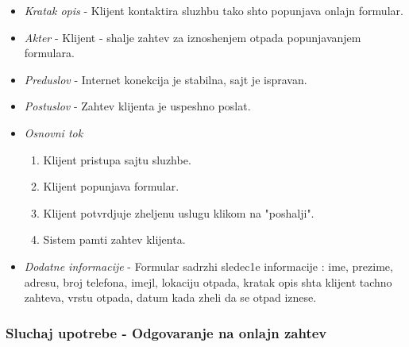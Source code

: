 \documentclass[10 pt]{article}
\begin{document}
		\begin{itemize}
			
			\item\textit{Kratak opis} - Klijent kontaktira sluzhbu tako shto popunjava onlajn formular.
	
			\item\textit{Akter} - Klijent - shalje zahtev za iznoshenjem otpada popunjavanjem formulara.
			
			\item\textit{Preduslov} - Internet konekcija je stabilna, sajt je ispravan.
			
			\item\textit{Postuslov} - Zahtev klijenta je uspeshno poslat.

			
			\item\textit{Osnovni tok} 
				\begin{enumerate}
					\item Klijent pristupa sajtu sluzhbe.
					\item Klijent popunjava formular.
					\item Klijent potvrdjuje zheljenu uslugu klikom na "poshalji".
					\item Sistem pamti zahtev klijenta.
				\end{enumerate}
			
			\item\textit{Dodatne informacije}
- Formular sadrzhi sledec1e informacije : ime, prezime, adresu, broj telefona, imejl, lokaciju otpada, kratak opis shta klijent tachno zahteva, vrstu otpada, datum kada zheli da se otpad iznese.
			

		\end{itemize}
	\newpage
	\subsubsection{Sluchaj upotrebe - Odgovaranje na onlajn zahtev}
	
\end{document}
